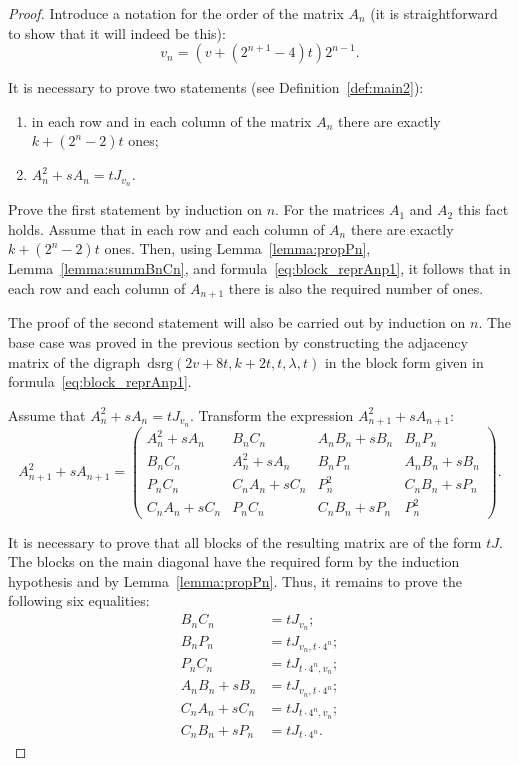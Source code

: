 \documentclass{article}
\begin{document}
\begin{proof}
Introduce a notation for the order of the matrix $A_n$ (it is straightforward to show that it will indeed be this):
\begin{equation}
    v_n = (v+(2^{n+1}-4)t)2^{n-1}.
\end{equation}

It is necessary to prove two statements (see Definition~\ref{def:main2}):
\begin{enumerate}
	\item in each row and in each column of the matrix $A_n$ there are exactly $k+(2^n-2)t$ ones;
	\item $A_n^2 + sA_n = tJ_{v_n}$.
\end{enumerate}

Prove the first statement by induction on $n$. For the matrices $A_1$ and $A_2$ this fact holds. Assume that in each row and each column of $A_n$ there are exactly $k+(2^n-2)t$ ones. Then, using Lemma~\ref{lemma:propPn}, Lemma~\ref{lemma:summBnCn}, and formula~\eqref{eq:block_reprAnp1}, it follows that in each row and each column of $A_{n+1}$ there is also the required number of ones.

The proof of the second statement will also be carried out by induction on $n$. The base case was proved in the previous section by constructing the adjacency matrix of the digraph~$\text{dsrg}(2v+8t, k+2t, t, \lambda, t)$ in the block form given in formula~\eqref{eq:block_reprAnp1}.

Assume that $A_n^2 + sA_n = tJ_{v_n}$. Transform the expression $A_{n+1}^2 + sA_{n+1}$:
\begin{equation}
A_{n+1}^2 + sA_{n+1} = 
\left(
\begin{array}{c|c|c|c}
	A_n^2+sA_n & B_n C_n & A_n B_n + sB_n & B_n P_n \\ \hline
	B_n C_n & A_n^2+sA_n & B_n P_n & A_n B_n + sB_n \\ \hline
	P_n C_n & C_n A_n + sC_n & P_n^2 & C_n B_n + sP_n \\ \hline
	C_n A_n + sC_n & P_n C_n & C_n B_n + sP_n & P_n^2
\end{array}
\right).
\end{equation}

It is necessary to prove that all blocks of the resulting matrix are of the form $tJ$. The blocks on the main diagonal have the required form by the induction hypothesis and by Lemma~\ref{lemma:propPn}. Thus, it remains to prove the following six equalities:
\begin{align}
B_n C_n &= tJ_{v_n}; \label{eq:system1}\\
B_n P_n &= tJ_{v_n, t\cdot{4^n}}; \label{eq:system2}\\
P_n C_n &= tJ_{t\cdot{4^n}, v_n}; \label{eq:system3}\\
A_n B_n + sB_n &= tJ_{v_n, t\cdot{4^n}}; \label{eq:system4}\\
C_n A_n + sC_n &= tJ_{t\cdot{4^n}, v_n}; \label{eq:system5}\\
C_n B_n + sP_n &= tJ_{t\cdot{4^n}} \label{eq:system6}.
\end{align}


\end{proof}
\end{document}
